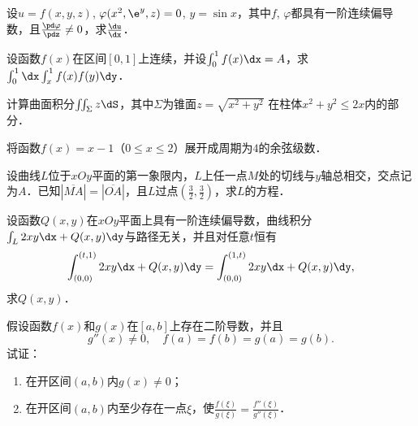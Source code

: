 \documentclass[plain,noanswer,medmath]{../../template/jnuexam}
\begin{document}


\begin{problem}
设$u = f(x,y,z)$, $\varphi (x^2,\e^y,z) = 0$, $y = \sin x$，其中$f$, $\varphi$都具有一阶连续偏导数，且$\frac{\pd \varphi}{\pdz} \ne 0$，求$\frac{\du}{\dx}$．
\end{problem}


\begin{problem}
设函数$f(x)$在区间$[0,1]$上连续，并设$\int_0^1f(x)\dx = A$，求$\int_0^1\dx\int_x^1f(x)f(y)\dy$．
\end{problem}




\begin{problem}
计算曲面积分$\iint_{\Sigma}z\dS$，其中$\Sigma$为锥面$z = \sqrt{x^2 + y^2}$
在柱体$x^2 + y^2 \le 2x$内的部分．
\end{problem}


\begin{problem}
将函数$f(x) = x - 1$（$0 \le x \le 2$）展开成周期为$4$的余弦级数．
\end{problem}



\begin{problem}
设曲线$L$位于$xOy$平面的第一象限内，$L$上任一点$M$处的切线与$y$轴总相交，交点记为$A$．已知$\left| \overline{MA} \right| = \left| \overline{OA} \right|$，且$L$过点$\left(\frac{3}{2},\frac{3}{2} \right)$，求$L$的方程．
\end{problem}



\begin{problem}
设函数$Q(x,y)$在$xOy$平面上具有一阶连续偏导数，曲线积分$\int_L 2xy\dx + Q(x,y)\dy$与路径无关，并且对任意$t$恒有
$$\int_{(0,0)}^{(t,1)} 2xy\dx + Q(x,y)\dy = \int_{(0,0)}^{(1,t)} 2xy\dx + Q(x,y)\dy ,$$
求$Q(x,y)$．
\end{problem}



\begin{problem}
假设函数$f(x)$和$g(x)$在$[a,b]$上存在二阶导数，并且
$$g''(x) \ne 0,\quad f(a) = f(b) = g(a) = g(b).$$
试证：
\begin{enumerate}
\item 在开区间$(a,b)$内$g(x) \ne 0$；
\item 在开区间$(a,b)$内至少存在一点$\xi$，使$\frac{f(\xi)}{g(\xi)} = \frac{f''(\xi)}{g''(\xi)}$．
\end{enumerate}
\end{problem}
\end{document}
